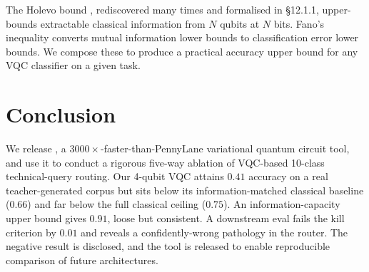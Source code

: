 The Holevo bound \citep{holevo1973bounds}, rediscovered many times and formalised in \citet{nielsen2010quantum} \S12.1.1, upper-bounds extractable classical information from $N$ qubits at $N$ bits. Fano's inequality \citep{fano1961transmission} converts mutual information lower bounds to classification error lower bounds. We compose these to produce a practical accuracy upper bound for any VQC classifier on a given task.

\section{Conclusion}

We release \torchvqc{}, a $3000\times$-faster-than-PennyLane variational quantum circuit tool, and use it to conduct a rigorous five-way ablation of VQC-based 10-class technical-query routing. Our 4-qubit VQC attains $0.41$ accuracy on a real teacher-generated corpus but sits below its information-matched classical baseline ($0.66$) and far below the full classical ceiling ($0.75$). An information-capacity upper bound gives $0.91$, loose but consistent. A downstream eval fails the kill criterion by $0.01$ and reveals a confidently-wrong pathology in the \vqc{} router. The negative result is disclosed, and the tool is released to enable reproducible comparison of future architectures.




